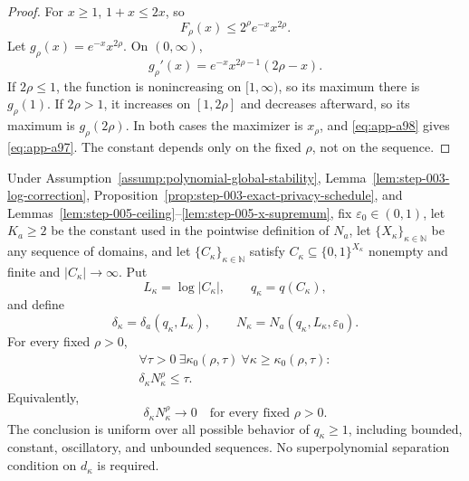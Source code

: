 \begin{proof}
For \(x\geq1\), \(1+x\leq2x\), so
\begin{equation}
F_\rho(x)\leq2^\rho e^{-x}x^{2\rho}.
\label{eq:app-a98}
\end{equation}
Let \(g_\rho(x)=e^{-x}x^{2\rho}\).  On \((0,\infty)\),
\begin{equation}
g_\rho'(x)
=e^{-x}x^{2\rho-1}(2\rho-x).
\label{eq:app-a99}
\end{equation}
If \(2\rho\leq1\), the function is nonincreasing on
\([1,\infty)\), so its maximum there is \(g_\rho(1)\).  If
\(2\rho>1\), it increases on \([1,2\rho]\) and decreases afterward,
so its maximum is \(g_\rho(2\rho)\).  In both cases the maximizer is
\(x_\rho\), and \eqref{eq:app-a98} gives \eqref{eq:app-a97}.  The constant depends only on
the fixed \(\rho\), not on the sequence.
\end{proof}

\begin{proposition}
\label{prop:step-005-privacy-negligibility}
Under Assumption~\ref{assump:polynomial-global-stability},
Lemma~\ref{lem:step-003-log-correction},
Proposition~\ref{prop:step-003-exact-privacy-schedule}, and
Lemmas~\ref{lem:step-005-ceiling}--\ref{lem:step-005-x-supremum},
fix \(\varepsilon_0\in(0,1)\), let \(K_a\geq2\) be the constant used
in the pointwise definition of \(N_a\), let
\(\{X_\kappa\}_{\kappa\in\mathbb N}\) be any sequence of domains, and
let \(\{C_\kappa\}_{\kappa\in\mathbb N}\) satisfy
\(C_\kappa\subseteq\{0,1\}^{X_\kappa}\) nonempty and finite and
\(|C_\kappa|\to\infty\).  Put
\[
L_\kappa=\log|C_\kappa|,\qquad q_\kappa=q(C_\kappa),
\]
and define
\[
\delta_\kappa=\delta_a(q_\kappa,L_\kappa),\qquad
N_\kappa=N_a(q_\kappa,L_\kappa,\varepsilon_0).
\]
For every fixed \(\rho>0\),
\begin{equation}
\begin{gathered}
\forall\tau>0\ \exists\kappa_0(\rho,\tau)\
\forall\kappa\geq\kappa_0(\rho,\tau):\\
\delta_\kappa N_\kappa^\rho\leq\tau.
\end{gathered}
\label{eq:app-a100}
\end{equation}
Equivalently,
\begin{equation}
\delta_\kappa N_\kappa^\rho\longrightarrow0
\quad\text{for every fixed }\rho>0.
\label{eq:app-a101}
\end{equation}
The conclusion is uniform over all possible behavior of
\(q_\kappa\geq1\), including bounded, constant, oscillatory, and
unbounded sequences.  No superpolynomial separation condition on
\(d_\kappa\) is required.
\end{proposition}

